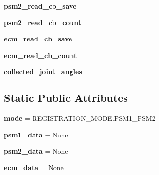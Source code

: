 \begin{DoxyCompactItemize}
\item 
\hypertarget{classbase__coregistration_1_1coregistrator_ad2374fdab9f79db544fe586860e5efc9}{{\bfseries psm2\-\_\-read\-\_\-cb\-\_\-save}}\label{classbase__coregistration_1_1coregistrator_ad2374fdab9f79db544fe586860e5efc9}

\item 
\hypertarget{classbase__coregistration_1_1coregistrator_a361efaacc34fb50c8eea2d1b149d3653}{{\bfseries psm2\-\_\-read\-\_\-cb\-\_\-count}}\label{classbase__coregistration_1_1coregistrator_a361efaacc34fb50c8eea2d1b149d3653}

\item 
\hypertarget{classbase__coregistration_1_1coregistrator_ae58982e5f9fbafb53cdd372695fd8a7e}{{\bfseries ecm\-\_\-read\-\_\-cb\-\_\-save}}\label{classbase__coregistration_1_1coregistrator_ae58982e5f9fbafb53cdd372695fd8a7e}

\item 
\hypertarget{classbase__coregistration_1_1coregistrator_ace065946b7b2362fb8f4553b34e83ed3}{{\bfseries ecm\-\_\-read\-\_\-cb\-\_\-count}}\label{classbase__coregistration_1_1coregistrator_ace065946b7b2362fb8f4553b34e83ed3}

\item 
\hypertarget{classbase__coregistration_1_1coregistrator_a735ac19f7e3d17739201c74067c1079d}{{\bfseries collected\-\_\-joint\-\_\-angles}}\label{classbase__coregistration_1_1coregistrator_a735ac19f7e3d17739201c74067c1079d}

\end{DoxyCompactItemize}
\subsection*{Static Public Attributes}
\begin{DoxyCompactItemize}
\item 
\hypertarget{classbase__coregistration_1_1coregistrator_ad4c82912da3ced9a97cca6d003cf6ed5}{{\bfseries mode} = R\-E\-G\-I\-S\-T\-R\-A\-T\-I\-O\-N\-\_\-\-M\-O\-D\-E.\-P\-S\-M1\-\_\-\-P\-S\-M2}\label{classbase__coregistration_1_1coregistrator_ad4c82912da3ced9a97cca6d003cf6ed5}

\item 
\hypertarget{classbase__coregistration_1_1coregistrator_abec95ddacfe2df642c94149730f1b160}{{\bfseries psm1\-\_\-data} = None}\label{classbase__coregistration_1_1coregistrator_abec95ddacfe2df642c94149730f1b160}

\item 
\hypertarget{classbase__coregistration_1_1coregistrator_a66efe42e6796f28399b28f99d464670a}{{\bfseries psm2\-\_\-data} = None}\label{classbase__coregistration_1_1coregistrator_a66efe42e6796f28399b28f99d464670a}

\item 
\hypertarget{classbase__coregistration_1_1coregistrator_ab59ae8bc38c01419c91796c922c35540}{{\bfseries ecm\-\_\-data} = None}\label{classbase__coregistration_1_1coregistrator_ab59ae8bc38c01419c91796c922c35540}

\end{DoxyCompactItemize}


